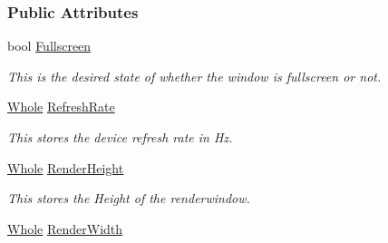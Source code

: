 \subsubsection*{Public Attributes}
\begin{DoxyCompactItemize}
\item 
\hypertarget{structMezzanine_1_1GraphicsSettings_a7d3aaf3759f1644be96f66ecc56206c8}{
bool \hyperlink{structMezzanine_1_1GraphicsSettings_a7d3aaf3759f1644be96f66ecc56206c8}{Fullscreen}}
\label{structMezzanine_1_1GraphicsSettings_a7d3aaf3759f1644be96f66ecc56206c8}

\begin{DoxyCompactList}\small\item\em This is the desired state of whether the window is fullscreen or not. \item\end{DoxyCompactList}\item 
\hypertarget{structMezzanine_1_1GraphicsSettings_a1e78c0bc59906c727b50b5cb08054e6f}{
\hyperlink{namespaceMezzanine_adcbb6ce6d1eb4379d109e51171e2e493}{Whole} \hyperlink{structMezzanine_1_1GraphicsSettings_a1e78c0bc59906c727b50b5cb08054e6f}{RefreshRate}}
\label{structMezzanine_1_1GraphicsSettings_a1e78c0bc59906c727b50b5cb08054e6f}

\begin{DoxyCompactList}\small\item\em This stores the device refresh rate in Hz. \item\end{DoxyCompactList}\item 
\hypertarget{structMezzanine_1_1GraphicsSettings_ac92f261b9753141847ff0464e136c435}{
\hyperlink{namespaceMezzanine_adcbb6ce6d1eb4379d109e51171e2e493}{Whole} \hyperlink{structMezzanine_1_1GraphicsSettings_ac92f261b9753141847ff0464e136c435}{RenderHeight}}
\label{structMezzanine_1_1GraphicsSettings_ac92f261b9753141847ff0464e136c435}

\begin{DoxyCompactList}\small\item\em This stores the Height of the renderwindow. \item\end{DoxyCompactList}\item 
\hypertarget{structMezzanine_1_1GraphicsSettings_a52d46790a4a475a45ee5a803768b74a9}{
\hyperlink{namespaceMezzanine_adcbb6ce6d1eb4379d109e51171e2e493}{Whole} \hyperlink{structMezzanine_1_1GraphicsSettings_a52d46790a4a475a45ee5a803768b74a9}{RenderWidth}}
\label{structMezzanine_1_1GraphicsSettings_a52d46790a4a475a45ee5a803768b74a9}


\end{DoxyCompactItemize}
